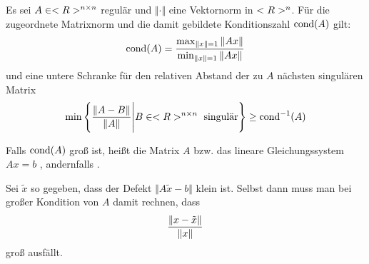 \begin{proposition}
	Es sei $A\in<R>^{n\times n}$ regulär und $\Vert\cdot\Vert$ eine Vektornorm in $<R>^n$. Für die zugeordnete Matrixnorm und die damit gebildete Konditionszahl $\operatorname{cond}(A)$ gilt:
	\begin{align}
		\operatorname{cond}(A) = \frac{\max_{\Vert x\Vert = 1}\Vert Ax\Vert}{\min_{\Vert x\Vert = 1}\Vert Ax\Vert}\notag
	\end{align}
	und eine untere Schranke für den relativen Abstand der zu $A$ nächsten singulären Matrix
	\begin{align}
		\min\left\lbrace \frac{\Vert A-B\Vert}{\Vert A\Vert} \Bigg| B\in<R>^{n\times n}\text{ singulär}\right\rbrace  \ge \operatorname{cond}^{-1}(A)\notag
	\end{align}
\end{proposition}

\begin{remark}
	Falls $\operatorname{cond}(A)$ groß ist, heißt die Matrix $A$ bzw. das lineare Gleichungssystem $Ax=b$ , andernfalls .
\end{remark}

Sei $\tilde{x}$ so gegeben, dass der Defekt $\Vert A\tilde{x}-b\Vert$ klein ist. Selbst dann muss man bei großer Kondition von $A$ damit rechnen, dass
\begin{align}
	\frac{\Vert x-\tilde{x}\Vert}{\Vert x\Vert}\notag
\end{align}
groß ausfällt.
